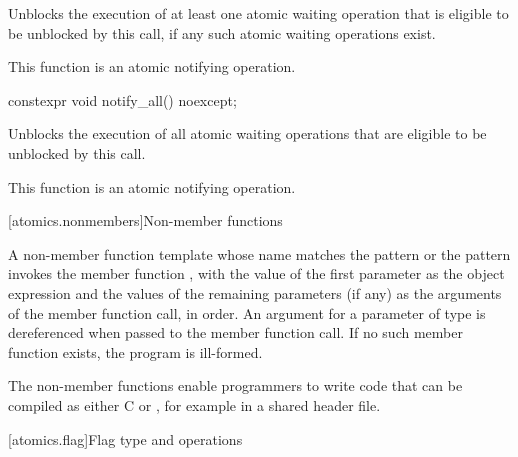 \begin{itemdescr}
\pnum
\effects
Unblocks the execution of at least one atomic waiting operation
that is eligible to be unblocked by this call,
if any such atomic waiting operations exist.

\pnum
\remarks
This function is an atomic notifying operation.
\end{itemdescr}

%
\begin{itemdecl}
constexpr void notify_all() noexcept;
\end{itemdecl}

\begin{itemdescr}
\pnum
\effects
Unblocks the execution of all atomic waiting operations
that are eligible to be unblocked by this call.

\pnum
\remarks
This function is an atomic notifying operation.
\end{itemdescr}

[atomics.nonmembers]{Non-member functions}

\pnum
A non-member function template whose name matches the pattern
 or the pattern 
invokes the member function , with the value of the
first parameter as the object expression and the values of the remaining parameters
(if any) as the arguments of the member function call, in order. An argument
for a parameter of type  is dereferenced when
passed to the member function call.
If no such member function exists, the program is ill-formed.

\pnum
\begin{note}
The non-member functions enable programmers to write code that can be
compiled as either C or \Cpp{}, for example in a shared header file.
\end{note}

[atomics.flag]{Flag type and operations}

